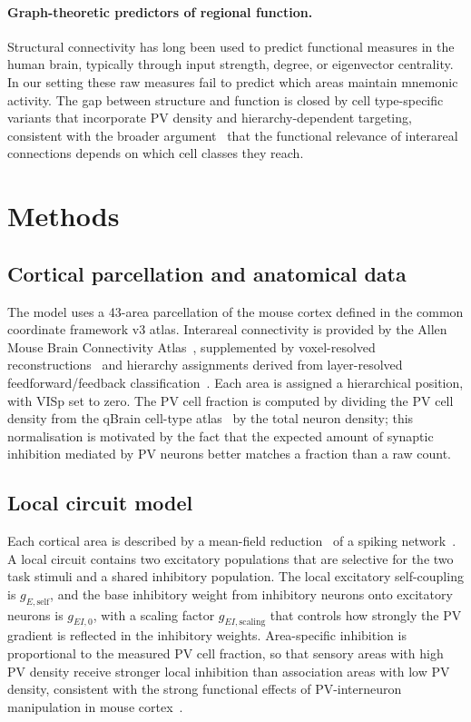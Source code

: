 \documentclass[11pt]{article}
\begin{document}
\paragraph{Graph-theoretic predictors of regional function.}
Structural connectivity has long been used to predict functional measures in the human brain, typically through input strength, degree, or eigenvector centrality. In our setting these raw measures fail to predict which areas maintain mnemonic activity. The gap between structure and function is closed by cell type-specific variants that incorporate PV density and hierarchy-dependent targeting, consistent with the broader argument~\cite{wang2020macroscopic,fulcher2019overlapping} that the functional relevance of interareal connections depends on which cell classes they reach.

\section{Methods}\label{sec:methods}

\subsection{Cortical parcellation and anatomical data}
The model uses a 43-area parcellation of the mouse cortex defined in the common coordinate framework v3 atlas. Interareal connectivity is provided by the Allen Mouse Brain Connectivity Atlas~\cite{oh2014mesoscale}, supplemented by voxel-resolved reconstructions~\cite{knox2018highresolution} and hierarchy assignments derived from layer-resolved feedforward/feedback classification~\cite{harris2019hierarchical}. Each area is assigned a hierarchical position, with VISp set to zero. The PV cell fraction is computed by dividing the PV cell density from the qBrain cell-type atlas~\cite{kim2017braintype} by the total neuron density; this normalisation is motivated by the fact that the expected amount of synaptic inhibition mediated by PV neurons better matches a fraction than a raw count.

\subsection{Local circuit model}
Each cortical area is described by a mean-field reduction~\cite{wongwang2006recurrent} of a spiking network~\cite{wang2002probabilistic}. A local circuit contains two excitatory populations that are selective for the two task stimuli and a shared inhibitory population. The local excitatory self-coupling is $g_{E,\text{self}}$, and the base inhibitory weight from inhibitory neurons onto excitatory neurons is $g_{EI,0}$, with a scaling factor $g_{EI,\text{scaling}}$ that controls how strongly the PV gradient is reflected in the inhibitory weights. Area-specific inhibition is proportional to the measured PV cell fraction, so that sensory areas with high PV density receive stronger local inhibition than association areas with low PV density, consistent with the strong functional effects of PV-interneuron manipulation in mouse cortex~\cite{liu2014activation}.
\end{document}
